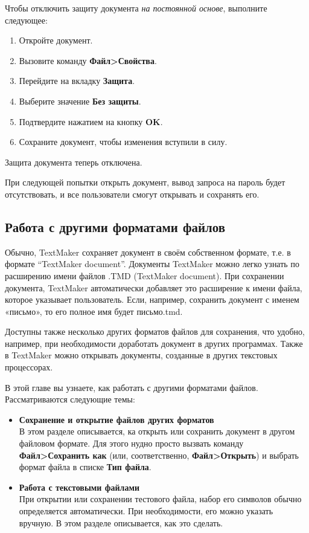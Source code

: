 ﻿\documentclass[a4paper,10pt]{article}
\begin{document}
Чтобы отключить защиту документа \textit{на постоянной основе}, выполните следующее:
\begin{enumerate}
 \item Откройте документ.
 \item Вызовите команду \textbf{Файл>Свойства}.
 \item Перейдите на вкладку \textbf{Защита}.
 \item Выберите значение \textbf{Без защиты}.
 \item Подтвердите нажатием на кнопку \textbf{OK}.
 \item Сохраните документ, чтобы изменения вступили в силу.
\end{enumerate}

Защита документа теперь отключена.

При следующей попытки открыть документ, вывод запроса на пароль будет отсутствовать, и все пользователи смогут открывать и сохранять его.

\subsection{Работа с другими форматами файлов} \label{sec:рабсдрформатамифайлов}
Обычно, TextMaker сохраняет документ в своём собственном формате, т.е. в формате “TextMaker document”. Документы TextMaker можно легко узнать по расширению имени файлов .TMD (TextMaker document). При сохранении документа, TextMaker автоматически добавляет это расширение к имени файла, которое указывает пользователь. Если, например, сохранить документ с именем «письмо», то его полное имя будет письмо.tmd.

Доступны также несколько других форматов файлов для сохранения, что удобно, например, при необходимости доработать документ в других программах. Также в TextMaker можно открывать документы, созданные в других текстовых процессорах.

В этой главе вы узнаете, как работать с другими форматами файлов. Рассматриваются следующие темы:

\begin{itemize}
 \item \textbf{Сохранение и открытие файлов других форматов}\\
 В этом разделе описывается, ка открыть или сохранить документ в другом файловом формате. Для этого нудно просто вызвать команду \textbf{Файл>Сохранить как} (или, соответственно, \textbf{Файл>Открыть}) и выбрать формат файла в списке \textbf{Тип файла}.
 \item \textbf{Работа с текстовыми файлами}\\
 При открытии или сохранении тестового файла, набор его символов обычно определяется автоматически. При необходимости, его можно указать вручную. В этом разделе описывается, как это сделать.
 \end{itemize}
\end{document}
